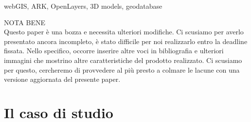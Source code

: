 \documentclass{paper}
\begin{document}
\begin{abstract}
IT abstract --- TODO\\

This paper shows how a set of open source tools, raging from CSS templates to JavaScript libraries, from PHP interfaces to PostGIS and MySQL databases, can be used to create a complete environment for both touristic and enhanced view of archaeological data.

During this experience various frontend tools have been analyzed and compared, and a some of them have been chosen to create a touristic purposed archaeological website, www.sipontoaperta.it, and the corresponding data management interface with on-request only access; in this setup the "stratigraphic unit" approach to data management has been mixed with "single context record"-based tools and spatial-enabled database plus Python scripts to obtain a full featured (albeit user friendly) webGIS.

The work also presents for the first time in literature a successful stratigraphic unit data import into the ARK platform, and an OpenLayer plus Pannellum setup to create the first 360 degree immersive photographic webtour documented on an archaeological site.

To increase the attractiveness and the competitiveness of the website, 3D laser-scanned reconstructions have been created, exported using well documented formats and embedded in the webGIS using open source JavaScript tools.
\end{abstract}

\begin{keywords}
    webGIS, ARK, OpenLayers, 3D models, geodatabase
\end{keywords}

NOTA BENE\\
Questo paper è una bozza e necessita ulteriori modifiche. Ci scusiamo per averlo presentato ancora incompleto, è stato difficile per noi realizzarlo entro la deadline fissata. Nello specifico, occorre inserire altre voci in bibliografia e ulteriori immagini che mostrino altre caratteristiche del prodotto realizzato. Ci scusiamo per questo, cercheremo di provvedere al più presto a colmare le lacune con una versione aggiornata del presente paper.

\pagebreak{}

\section{Il caso di studio}
\end{document}
